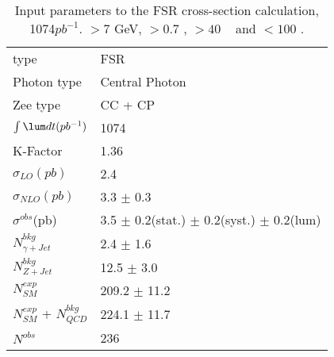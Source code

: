 \documentclass[12pt,twoside,letterpaper]{article}
\begin{document}
   \begin{table}[!hbtp]                                                 
      \begin{center}                                                    
      \begin{tabular}{|l|l|}\hline \hline                         
 	   \Zg type       &FSR           \\ 
       Photon type        &  Central Photon           \\ 
       Zee type        &  CC + CP           \\ 
   \hline 
 	   $\int \lum dt(pb^{-1})$         & 1074          \\ 
   	   K-Factor                   & 1.36                 \\ 
   	   $\sigma_{LO}(pb)$         & 2.4           \\ 
 	   $\sigma_{NLO}(pb)$        & 3.3 $\pm$ 0.3                  \\ 
   \hline 
 $\sigma^{obs}$(pb)  &   3.5 $\pm$ 0.2(stat.)  $\pm$ 0.2(syst.)  $\pm$ 0.2(lum)   \\ 
   \hline 
   \hline 
 $N^{bkg}_{\gamma+Jet}$     &            2.4 $\pm$ 1.6\\ 
  $N^{bkg}_{Z+Jet}$     &           12.5 $\pm$ 3.0\\ 
          $N^{exp}_{SM}$&          209.2 $\pm$ 11.2\\ 
 $N^{exp}_{SM}$ + $N^{bkg}_{QCD}$     &          224.1 $\pm$ 11.7\\ 
   \hline 
               $N^{obs}$&            236\\ 
	 \hline\hline                                                                
      \end{tabular}                                                             
      \end{center}                                                              
      \caption{Input parameters to the FSR \eeg  cross-section calculation, 1074$pb^{-1}$. \Etg $> 7$ GeV, \DeltaR $> 0.7$ , \Mee $> 40$ \GeVCC~ and \Meeg $< 100$ \GeVCC. }  
      \label{Table:eegAcceptanceFSR1fb}                                                        
   \end{table}                                                                  
\end{document}
